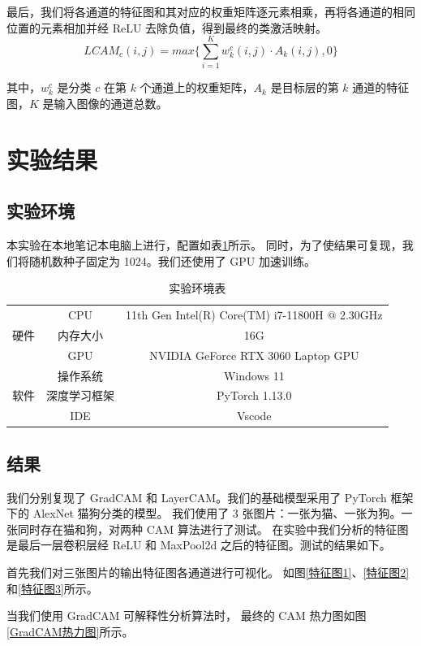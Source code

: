 \documentclass[supercite]{Experimental_Report}
\theoremstyle{definition}
\begin{document}
最后，我们将各通道的特征图和其对应的权重矩阵逐元素相乘，再将各通道的相同位置的元素相加并经 ReLU 去除负值，得到最终的类激活映射。
\begin{equation}
LCAM_c(i,j)=max\{\sum_{i=1}^{K}w_k^c(i,j)\cdot A_k(i,j),0\}
\end{equation}

其中，$w_k^c$ 是分类 $c$ 在第 $k$ 个通道上的权重矩阵，$A_k$ 是目标层的第 $k$ 通道的特征图，$K$ 是输入图像的通道总数。

\section{实验结果}
\subsection{实验环境}
本实验在本地笔记本电脑上进行，配置如表\ref{服务器配置}所示。
同时，为了使结果可复现，我们将随机数种子固定为 1024。我们还使用了 GPU 加速训练。
\begin{table}[H]
	\centering
	\caption{实验环境表}
	  \begin{tabular}{c|c|c}
		\toprule
	  \multirow{3}[0]{*}{硬件} & CPU   & 11th Gen Intel(R) Core(TM) i7-11800H @ 2.30GHz \\
			& 内存大小    & 16G \\
			& GPU   & NVIDIA GeForce RTX 3060 Laptop GPU \\\hline
	  \multirow{3}[0]{*}{软件} & 操作系统  & Windows 11 \\
			& 深度学习框架 & PyTorch 1.13.0 \\
			& IDE   & Vscode \\\bottomrule
	  \end{tabular}
	\label{服务器配置}
\end{table}

\subsection{结果}
我们分别复现了 GradCAM 和 LayerCAM。我们的基础模型采用了 PyTorch 框架下的 AlexNet 猫狗分类的模型。
我们使用了 3 张图片：一张为猫、一张为狗。一张同时存在猫和狗，对两种 CAM 算法进行了测试。
在实验中我们分析的特征图是最后一层卷积层经 ReLU 和 MaxPool2d 之后的特征图。测试的结果如下。

首先我们对三张图片的输出特征图各通道进行可视化。
如图\ref{特征图1}、\ref{特征图2}和\ref{特征图3}所示。

当我们使用 GradCAM 可解释性分析算法时，
最终的 CAM 热力图如图 \ref{GradCAM热力图}所示。
\end{document}
